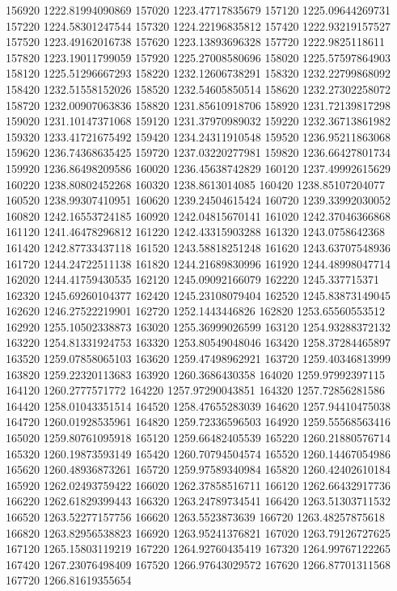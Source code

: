 {156920 1222.81994090869
157020 1223.47717835679
157120 1225.09644269731
157220 1224.58301247544
157320 1224.22196835812
157420 1222.93219157527
157520 1223.49162016738
157620 1223.13893696328
157720 1222.9825118611
157820 1223.19011799059
157920 1225.27008580696
158020 1225.57597864903
158120 1225.51296667293
158220 1232.12606738291
158320 1232.22799868092
158420 1232.51558152026
158520 1232.54605850514
158620 1232.27302258072
158720 1232.00907063836
158820 1231.85610918706
158920 1231.72139817298
159020 1231.10147371068
159120 1231.37970989032
159220 1232.36713861982
159320 1233.41721675492
159420 1234.24311910548
159520 1236.95211863068
159620 1236.74368635425
159720 1237.03220277981
159820 1236.66427801734
159920 1236.86498209586
160020 1236.45638742829
160120 1237.49992615629
160220 1238.80802452268
160320 1238.8613014085
160420 1238.85107204077
160520 1238.99307410951
160620 1239.24504615424
160720 1239.33992030052
160820 1242.16553724185
160920 1242.04815670141
161020 1242.37046366868
161120 1241.46478296812
161220 1242.43315903288
161320 1243.0758642368
161420 1242.87733437118
161520 1243.58818251248
161620 1243.63707548936
161720 1244.24722511138
161820 1244.21689830996
161920 1244.48998047714
162020 1244.41759430535
162120 1245.09092166079
162220 1245.337715371
162320 1245.69260104377
162420 1245.23108079404
162520 1245.83873149045
162620 1246.27522219901
162720 1252.1443446826
162820 1253.65560553512
162920 1255.10502338873
163020 1255.36999026599
163120 1254.93288372132
163220 1254.81331924753
163320 1253.80549048046
163420 1258.37284465897
163520 1259.07858065103
163620 1259.47498962921
163720 1259.40346813999
163820 1259.22320113683
163920 1260.3686430358
164020 1259.97992397115
164120 1260.2777571772
164220 1257.97290043851
164320 1257.72856281586
164420 1258.01043351514
164520 1258.47655283039
164620 1257.94410475038
164720 1260.01928535961
164820 1259.72336596503
164920 1259.55568563416
165020 1259.80761095918
165120 1259.66482405539
165220 1260.21880576714
165320 1260.19873593149
165420 1260.70794504574
165520 1260.14467054986
165620 1260.48936873261
165720 1259.97589340984
165820 1260.42402610184
165920 1262.02493759422
166020 1262.37858516711
166120 1262.66432917736
166220 1262.61829399443
166320 1263.24789734541
166420 1263.51303711532
166520 1263.52277157756
166620 1263.5523873639
166720 1263.48257875618
166820 1263.82956538823
166920 1263.95241376821
167020 1263.79126727625
167120 1265.15803119219
167220 1264.92760435419
167320 1264.99767122265
167420 1267.23076498409
167520 1266.97643029572
167620 1266.87701311568
167720 1266.81619355654
}
